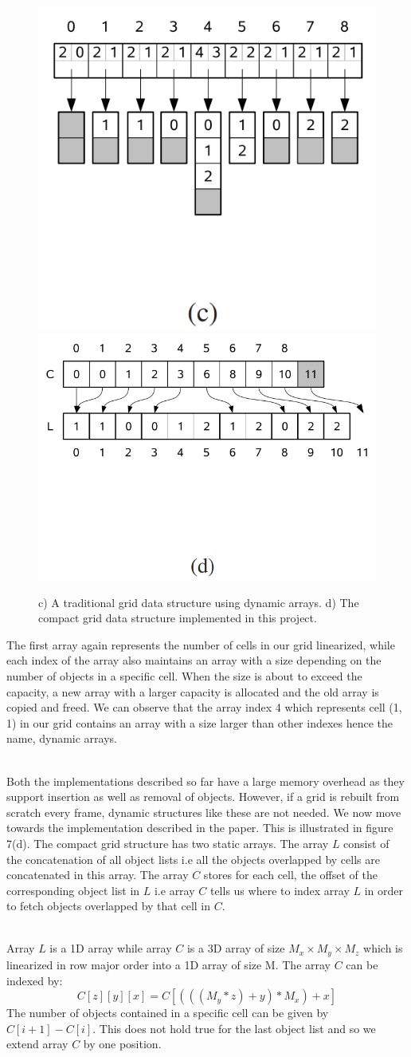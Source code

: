 \documentclass[11pt,a4paper]{article}
\begin{document}
\begin{figure}[H]
	\centering
	\captionsetup{justification=centering}
	\includegraphics[width=.3\textwidth]{uniformgrids3}\quad
	\includegraphics[width=.3\textwidth]{uniformgrids4}\quad
	\caption{c) A traditional grid data structure using dynamic arrays. d) The compact grid data structure implemented in this project.
 \protect\cite{lagae2008compact}}
\end{figure}
The first array again represents the number of cells in our grid linearized, while each index of the array also maintains an array with a size depending on the number of objects in a specific cell. When the size is about to exceed the capacity, a new array with a larger capacity is allocated and the old array is copied and freed. We can observe that the array index 4 which represents cell (1, 1) in our grid contains an array with a size larger than other indexes hence the name, dynamic arrays.

\noindent
\\
Both the implementations described so far have a large memory overhead as they support insertion as well as removal of objects. However, if a grid is rebuilt from scratch every frame, dynamic structures like these are not needed. We now move towards the implementation described in the paper. This is illustrated in figure 7(d). The compact grid structure has two static arrays. The array $L$ consist of the concatenation of all object lists i.e all the objects overlapped by cells are concatenated in this array. The array $C$ stores for each cell, the offset of the corresponding object list in $L$ i.e array $C$ tells us where to index array $L$ in order to fetch objects overlapped by that cell in $C$.

\noindent
\\
Array $L$ is a 1D array while array $C$ is a 3D array of size $M_{x} \times M_{y} \times M_{z}$ which is linearized in row major order into a 1D array of size M. The array $C$ can be indexed by:
\begin{equation}
C[z][y][x] = C[(((M_{y} * z) + y) * M_{x}) + x]
\end{equation}
The number of objects contained in a specific cell can be given by $C[i+1] - C[i]$. This does not hold true for the last object list and so we extend array $C$ by one position.
\\
\noindent
\end{document}
